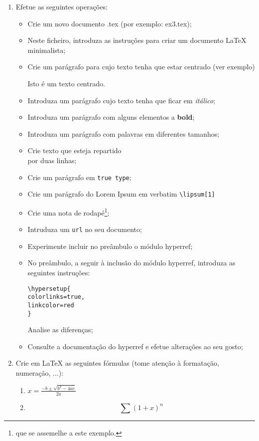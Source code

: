\begin{enumerate}
\item Efetue as seguintes operações:
\begin{itemize}
\item Crie um novo documento .tex (por exemplo: ex3.tex);
\item Neste ficheiro, introduza as instruções para criar um documento \LaTeX{} minimalista;
\item Crie um parágrafo para cujo texto tenha que estar centrado (ver exemplo)
\begin{center}
Isto é um texto centrado.
\end{center}
\item Introduza um parágrafo cujo texto tenha que ficar em \emph{itálico};
\item Introduza um parágrafo com alguns elementos a \textbf{bold};
\item Introduza um parágrafo com \large palavras em \scriptsize diferentes \huge tamanhos;\normalsize
\item Crie texto que esteja repartido\\por duas linhas;
\item Crie um parágrafo em \texttt{true type};
\item Crie um parágrafo do Lorem Ipsum em verbatim \verb!\lipsum[1]!
\item Crie uma nota de rodapé\footnote{que se assemelhe a este exemplo.};	
\item Intruduza um \verb!url! no seu documento;
\item Experimente incluir no preâmbulo o módulo hyperref;
\item No preâmbulo, a seguir à inclusão do módulo hyperref, introduza as seguintes instruções:\\
\begin{verbatim}
\hypersetup{
colorlinks=true,
linkcolor=red
}
\end{verbatim}
Analise as diferenças;
\item Consulte a documentação do hyperref e efetue alterações ao seu gosto;
\end{itemize}

\item Crie em \LaTeX{} as seguintes fórmulas (tome atenção à formatação, numeração, $\ldots$):
\begin{enumerate}
\item $x = \frac{-b \pm \sqrt{b^2 - 4ac}}{2a}$

\item 
\[
\sum (1+x)^n
\]


\end{enumerate}
\end{enumerate}
